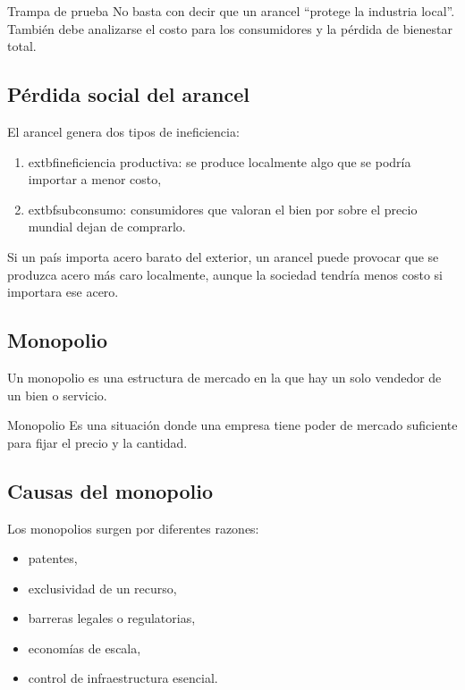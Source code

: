 \begin{advertencia}{Trampa de prueba}
No basta con decir que un arancel “protege la industria local”. También debe analizarse el costo para los consumidores y la pérdida de bienestar total.
\end{advertencia}

\subsection{Pérdida social del arancel}

El arancel genera dos tipos de ineficiencia:
\begin{enumerate}
    \item 	extbf{ineficiencia productiva:} se produce localmente algo que se podría importar a menor costo,
    \item 	extbf{subconsumo:} consumidores que valoran el bien por sobre el precio mundial dejan de comprarlo.
\end{enumerate}

\begin{ejemplo}
Si un país importa acero barato del exterior, un arancel puede provocar que se produzca acero más caro localmente, aunque la sociedad tendría menos costo si importara ese acero.
\end{ejemplo}

\subsection{Monopolio}

Un monopolio es una estructura de mercado en la que hay un solo vendedor de un bien o servicio.

\begin{concepto}{Monopolio}
Es una situación donde una empresa tiene poder de mercado suficiente para fijar el precio y la cantidad.
\end{concepto}

\subsection{Causas del monopolio}

Los monopolios surgen por diferentes razones:
\begin{itemize}
    	\item patentes,
    \item exclusividad de un recurso,
    \item barreras legales o regulatorias,
    \item economías de escala,
    \item control de infraestructura esencial.
\end{itemize}

